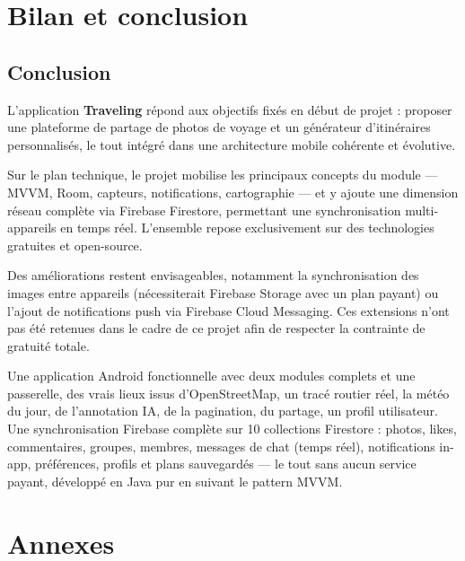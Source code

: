 \documentclass[a4paper,12pt,openany]{report}
\newenvironment{okbox}[1][]{%
  \begin{tcolorbox}[mybox, colback=okbg, colframe=teal!40,
    title=\textcolor{greentxt}{#1}]\small\color{greentxt!80!black}}
  {\end{tcolorbox}}
\begin{document}
\chapter{Bilan et conclusion}

\section{Conclusion}

L'application \textbf{Traveling} répond aux objectifs fixés en début de projet : proposer
une plateforme de partage de photos de voyage et un générateur d'itinéraires personnalisés,
le tout intégré dans une architecture mobile cohérente et évolutive.

Sur le plan technique, le projet mobilise les principaux concepts du module — MVVM, Room,
capteurs, notifications, cartographie — et y ajoute une dimension réseau complète via
Firebase Firestore, permettant une synchronisation multi-appareils en temps réel.
L'ensemble repose exclusivement sur des technologies gratuites et open-source.

Des améliorations restent envisageables, notamment la synchronisation des images entre
appareils (nécessiterait Firebase Storage avec un plan payant) ou l'ajout de
notifications push via Firebase Cloud Messaging. Ces extensions n'ont pas été retenues
dans le cadre de ce projet afin de respecter la contrainte de gratuité totale.

\begin{okbox}[Ce qu'on retient]
Une application Android fonctionnelle avec deux modules complets et une passerelle,
des vrais lieux issus d'OpenStreetMap, un tracé routier réel, la météo du jour,
de l'annotation IA, de la pagination, du partage, un profil utilisateur.
Une synchronisation Firebase complète sur 10 collections Firestore : photos, likes,
commentaires, groupes, membres, messages de chat (temps réel), notifications in-app,
préférences, profils et plans sauvegardés — le tout sans aucun service payant,
développé en Java pur en suivant le pattern MVVM.
\end{okbox}


\chapter*{Annexes}
\end{document}
